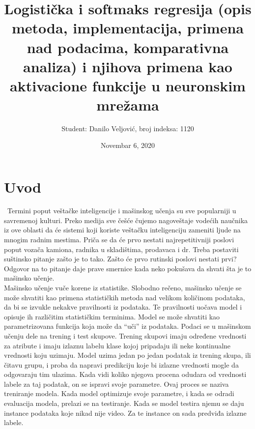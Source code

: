 \documentclass[a4paper,12pt]{report}
\begin{document}

\title{\Large{\textbf{Logistička i softmaks regresija (opis metoda, implementacija, primena nad podacima, komparativna analiza) i njihova primena kao aktivacione funkcije u neuronskim mrežama }}}
\author{Student: Danilo Veljović, broj indeksa: 1120}
\date{Novembar 6, 2020}
\maketitle
\let\cleardoublepage\clearpage
\tableofcontents


\setcounter{page}{1}

\chapter{Uvod}
\ Termini poput veštačke inteligencije i mašinskog učenja su sve popularniji u savremenoj kulturi. Preko medija sve češće čujemo nagoveštaje vodećih naučnika iz ove oblasti da će sistemi koji koriste veštačku inteligenciju zameniti ljude na mnogim radnim mestima. Priča se da će prvo nestati najrepetitivniji poslovi poput vozača kamiona, radnika u skladištima, prodavaca i dr. Treba postaviti suštinsko pitanje zašto je to tako. Zašto će prvo rutinski poslovi nestati prvi? Odgovor na to pitanje daje prave smernice kada neko pokušava da shvati šta je to mašinsko učenje. \\ 

Mašinsko učenje vuče korene iz statistike. Slobodno rečeno, mašinsko učenje se može shvatiti kao primena statističkih metoda nad velikom količinom podataka, da bi se izvukle nekakve pravilnosti iz podataka. Te pravilnosti uočava model i opisuje ih različitim statističkim terminima. Model se može shvatiti kao parametrizovana funkcija koja može da \enquote{uči} iz podataka. Podaci se u mašinskom učenju dele na trening i test skupove. Trening skupovi imaju određene vrednosti za atribute i imaju izlaznu labelu klase kojoj pripadaju ili neke kontinualne vrednosti koju uzimaju. Model uzima jedan po jedan podatak iz trening skupa, ili čitavu grupu, i proba da napravi predikciju koje bi izlazne vrednosti mogle da odgovaraju tim ulazima. Kada vidi koliko njegova procena odudara od vrednosti labele za taj podatak, on se ispravi svoje parametre. Ovaj proces se naziva treniranje modela. Kada model optimizuje svoje parametre, i kada se odradi evaluacija modela, prelazi se na testiranje. Kada se model testira njemu se daju instance podataka koje nikad nije video. Za te instance on sada predviđa izlazne labele. \\
\end{document}
